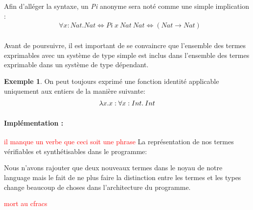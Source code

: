 \documentclass {article}
\newcommand{\codefrom}[3]
           {}
\theoremstyle{definition}
\newtheorem{example}{Exemple}
\theoremstyle{remark}
\newcommand{\todo}[1]{\textcolor{red}{#1}}
\begin{document}
Afin d'alléger la syntaxe, un \emph{Pi} anonyme sera noté comme une simple implication :
\begin{align*}
  & \forall x:Nat.Nat \Leftrightarrow Pi\: x\: Nat\: Nat \Leftrightarrow (Nat \rightarrow Nat) \\
\end{align*}

Avant de poursuivre, il est important de se convaincre que l'ensemble des termes exprimables avec un système 
de type simple est inclus dans l'ensemble des termes exprimable dans un système de type dépendant.
\begin{example}
  On peut toujours exprimé une fonction identité applicable uniquement aux entiers de la manière suivante:
  \begin{align*}
    &\lambda x. x : \forall x:Int.\: Int \\
  \end{align*}
\end{example}

\paragraph{Implémentation :} 

\todo{il manque un verbe que ceci soit une phrase }La représentation de nos termes vérifiables et synthétisables dans le programme:
\codefrom{dependent}{lambda}{inTm_head}
\codefrom{dependent}{lambda}{inTm}
\codefrom{dependent}{lambda}{exTm}

Nous n'avons rajouter que deux nouveaux termes dans le noyau de notre language mais 
le fait de ne plus faire la distinction entre les termes et les types change beaucoup de
choses dans l'architecture du programme. 


\todo{mort au cfracs}
\end{document}
